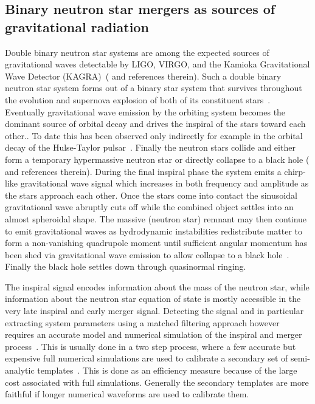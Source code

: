 \documentclass[12pt]{article}
\newcommand{\ligo}{LIGO}
\newcommand{\virgo}{VIRGO}
\newcommand{\kagra}{KAGRA}
\begin{document}
\subsection{Binary neutron star mergers as sources of gravitational radiation}
Double binary neutron star systems are among the expected sources of
gravitational waves detectable by
\ligo{}, \virgo{}, and the Kamioka Gravitational Wave Detector
(\kagra{})~(\cite{Anderson:2007km} and references therein).
Such a double binary neutron star system forms out of a binary
star system that
survives throughout the evolution and supernova explosion of both of its
constituent stars~\cite{Tauris:2003pf}. 
Eventually
gravitational wave emission by the orbiting system becomes the
dominant source of orbital decay and drives the inspiral of the stars toward
each other.. To date this has been
observed only indirectly for example 
in the orbital decay of the Hulse-Taylor pulsar~\cite{Hulse:1975}. 
Finally the neutron stars collide and either form
a temporary hypermassive neutron star or directly collapse to a black
hole (\cite{Faber:2012rw} and references therein). During the final inspiral
phase the system emits a
chirp-like gravitational wave signal which increases in both frequency and
amplitude as the stars approach each other. Once the stars come into
contact the sinusoidal gravitational wave abruptly cuts off 
while the combined object settles into an almost
spheroidal
shape. The massive (neutron star) remnant may then continue to emit
gravitational waves as hydrodynamic instabilities redistribute matter to form a
non-vanishing quadrupole moment until sufficient angular momentum has been
shed via gravitational wave emission to allow collapse to a black 
hole~\cite{Giacomazzo:2011cv}.  Finally the
black hole settles down through quasinormal ringing. 

The inspiral signal encodes information about the mass of the neutron star,
while information about the neutron star equation of state is mostly
accessible in the
very late
inspiral and early merger signal. Detecting the signal and in particular
extracting
system parameters using a matched filtering approach however requires an
accurate model and numerical simulation of the inspiral and merger
process~\cite{Anderson:2007km}. This is usually done in a two step process,
where a few accurate but expensive full numerical simulations are used to
calibrate a secondary set of semi-analytic templates~\cite{Bernuzzi:2012ci}.
This is done as an
efficiency measure because of the large cost associated with full
simulations. Generally the secondary templates are more faithful if longer
numerical waveforms are used to calibrate them. 
\end{document}
